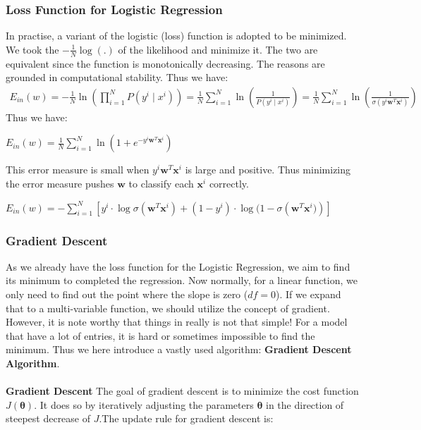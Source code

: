 \documentclass{article}
\begin{document}
\subsubsection{Loss Function for Logistic Regression}
In practise, a variant of the logistic (loss) function is adopted to be minimized. We took the $-\frac{1}{N}\log(.)$ of the likelihood and minimize it. The two are equivalent since the function is monotonically decreasing. The reasons are grounded in computational stability. Thus we have:
\begin{align*}
    E_{in}(w) = -\frac{1}{N}\ln\left(\prod_{i=1}^{N}P(y^{i} \mid x^{i})\right)
     = \frac{1}{N}\sum_{i=1}^{N} \ln\left(\frac{1}{P(y^{i} \mid x^{i})}\right)
     = \frac{1}{N}\sum_{i=1}^{N} \ln\left(\frac{1}{\sigma \left( y^{i} \bm{w}^{T}\bm{x}^{i}\right)} \right)
\end{align*}
Thus we have:
\begin{tcolorbox}[colback=yellow!20, colframe=yellow!90, title=Cross-Entropy Loss, coltitle=black]
$E_{in}(w) = \frac{1}{N}\sum_{i=1}^{N} \ln \left(1 + e^{-y^{i} \bm{w}^{T}\bm{x}^{i}}\right)$
\end{tcolorbox}
This error measure is small when $y^{i} \bm{w}^{T}\bm{x}^{i}$ is large and positive. Thus minimizing the error measure pushes $\bm{w}$ to classify each $\bm{x}^{i}$ correctly.
\begin{tcolorbox}[colback=yellow!20, colframe=yellow!90, title=Transformation of Cross-Entropy Loss, coltitle=black]
$E_{in}(w) = -\sum_{i=1}^{N} \left[ y^{i} \cdot \log \sigma \left( \bm{w}^{T}\bm{x}^{i}\right) +  (1 - y^{i}) \cdot \log (1- \sigma \left( \bm{w}^{T}\bm{x}^{i})\right) \right]$
\end{tcolorbox}

\subsubsection{Gradient Descent}
As we already have the loss function for the Logistic Regression, we aim to find its minimum to completed the regression. Now normally, for a linear function, we only need to find out the point where the slope is zero ($df=0$). If we expand that to a multi-variable function, we should utilize the concept of gradient. However, it is note worthy that things in really is not that simple! For a model that have a lot of entries, it is hard or sometimes impossible to find the minimum. Thus we here introduce a vastly used algorithm: \textbf{Gradient Descent Algorithm}.\\
 \\
 \textbf{Gradient Descent}
The goal of gradient descent is to minimize the cost function \( J(\mathbf{\theta}) \). It does so by iteratively adjusting the parameters \( \mathbf{\theta} \) in the direction of steepest decrease of \( J \).The update rule for gradient descent is:
\end{document}
